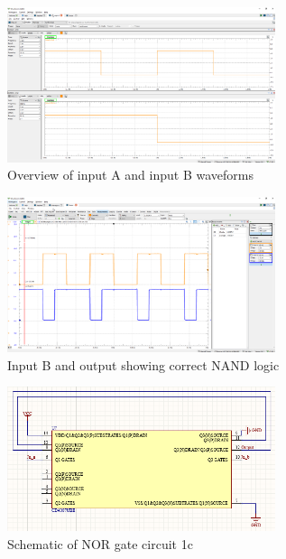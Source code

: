 \documentclass{article}
\begin{document}
	\begin{figure}[H]
	    \centering
	    \includegraphics[width=0.7\textwidth]{2c-setup}
	    \caption{Overview of input A and input B waveforms}
	\end{figure}
	
	\begin{figure}[H]
	    \centering
	    \includegraphics[width=0.7\textwidth]{2c-nand}
	    \caption{Input B and output showing correct NAND logic}
	\end{figure}
	
	\begin{figure}[H]
	    \centering
	    \includegraphics[width=0.7\textwidth]{2c-nor-lab}
	    \caption{Schematic of NOR gate circuit 1c}
	\end{figure}
	
\end{document}
